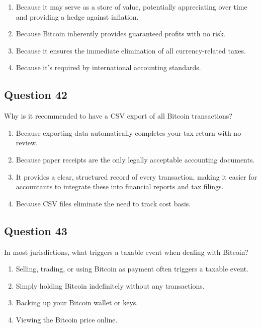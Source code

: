 \documentclass[12pt,a4paper]{article}
\begin{document}
\begin{enumerate}[label=\Alph*., leftmargin=*]
\item Because it may serve as a store of value, potentially appreciating over time and providing a hedge against inflation.
\item Because Bitcoin inherently provides guaranteed profits with no risk.
\item Because it ensures the immediate elimination of all currency-related taxes.
\item Because it’s required by international accounting standards.
\end{enumerate}

\bigskip


\subsection*{Question 42}
Why is it recommended to have a CSV export of all Bitcoin transactions?

\begin{enumerate}[label=\Alph*., leftmargin=*]
\item Because exporting data automatically completes your tax return with no review.
\item Because paper receipts are the only legally acceptable accounting documents.
\item It provides a clear, structured record of every transaction, making it easier for accountants to integrate these into financial reports and tax filings.
\item Because CSV files eliminate the need to track cost basis.
\end{enumerate}

\bigskip


\subsection*{Question 43}
In most jurisdictions, what triggers a taxable event when dealing with Bitcoin?

\begin{enumerate}[label=\Alph*., leftmargin=*]
\item Selling, trading, or using Bitcoin as payment often triggers a taxable event.
\item Simply holding Bitcoin indefinitely without any transactions.
\item Backing up your Bitcoin wallet or keys.
\item Viewing the Bitcoin price online.
\end{enumerate}
\end{document}
